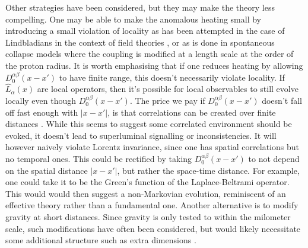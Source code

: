 \documentclass[aps,pra,showpacs,citeautoscript,amsmath,amssymb,floatfix,superscriptaddress,bbm, verbatim,amsfonts,changes,11pt,nofootinbib,longbibliography]{revtex4-2}
\def\L{{\hat{L}}}
\def\ab{^{\alpha\beta}}
\begin{document}
Other strategies have been considered, but they may make the theory less compelling. One may be able to make the anomalous heating small by introducing a small violation of locality as has been attempted in the case of Lindbladians in the context of field theories \cite{poulinKITP}, or as is done in spontaneous collapse models where the coupling is modified at a length scale at the order of the proton radius. 
It is worth emphasising that if one reduces heating by allowing  $D_0\ab(x-x')$ to have finite range, this doesn't necessarily violate locality. If $\L_{\alpha}(x)$ are local operators, then it's possible for local observables to still evolve locally even though $D_0\ab(x-x')$.  The price we pay if $D_0\ab(x-x')$ doesn't fall off fast enough with  $|x-x'|$, is that correlations can be created over finite distances \cite{bps, OR-intrinsic}. While this seems to suggest some  correlated environment should be evoked, it doesn't lead to superluminal signalling or inconsistencies. It will however naively violate Lorentz invariance, since one has spatial correlations but no temporal ones. This could be rectified by taking $D_0\ab(x-x')$ to not  depend on the spatial distance $|x-x'|$, but rather the space-time distance. For example, one could take it to be the Green's function of the Laplace-Beltrami operator. This would would then suggest a non-Markovian evolution, reminiscent of an effective theory rather than a fundamental one. 
Another alternative is to modify gravity at short distances. Since gravity is only tested to within the milometer scale, such modifications have often been considered, but would likely necessitate some additional structure such as extra dimensions \cite{arkani1998hierarchy}.
\end{document}
